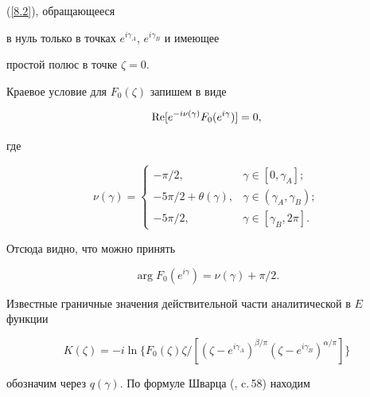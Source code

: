 {(\ref{8.2}), обращающееся


в нуль только в точках $e^{i\gamma_{A}}$, $e^{i\gamma_{B}}$ и имеющее


простой полюс в точке $\zeta = 0$.





Краевое условие для $F_{0}(\zeta)$ запишем в виде


\begin{equation}\label{8.3}


\re[e^{-i\nu(\gamma)}F_{0}(e^{i\gamma})]=0,


\end{equation}


где


\begin{equation}\label{8.4}


\nu (\gamma)=\begin{cases}


-\pi/2, & \gamma\in [0,\gamma_{A}];\\


-5\pi/2 +\theta(\gamma), & \gamma\in (\gamma_{A},\gamma_{B});\\


-5\pi/2, & \gamma\in [\gamma_{B},2\pi].


\end{cases}


\end{equation}


Отсюда видно, что можно принять


\begin{equation}\label{9.1}


\arg F_{0}(e^{i\gamma})=\nu(\gamma)+\pi/2.


\end{equation}





Известные граничные значения действительной части аналитической в $E$ функции


\begin{equation}\label{9.2}


K(\zeta)=-i\ln\{F_{0}(\zeta)\zeta/[(\zeta - e^{i\gamma_{A}})^{\beta/\pi}


(\zeta - e^{i\gamma_{B}})^{\alpha/\pi}]\}


\end{equation}


обозначим через $q(\gamma)$. По формуле Шварца (\cite{Ga}, c.\,58) находим


}
